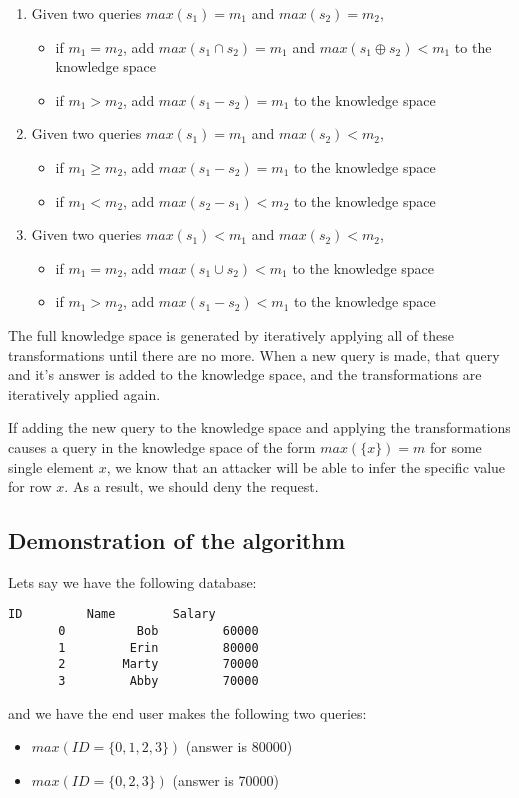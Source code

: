 \documentclass{article}
\begin{document}
\begin{enumerate}
    \item Given two queries $max(s_1) = m_1$ and $max(s_2) = m_2$,
    \begin{itemize}
        \item if $m_1 = m_2$, add $max(s_1 \cap s_2) = m_1$ and $max(s_1 \oplus s_2) < m_1$ to the knowledge space
        \item if $m_1 > m_2$, add $max(s_1 - s_2) = m_1$ to the knowledge space
    \end{itemize}
    \item Given two queries $max(s_1) = m_1$ and $max(s_2) < m_2$,
    \begin{itemize}
        \item if $m_1 \geq m_2$, add $max(s_1 - s_2) = m_1$ to the knowledge space
        \item if $m_1 < m_2$, add $max(s_2 - s_1) < m_2$ to the knowledge space
    \end{itemize}
    \item Given two queries $max(s_1) < m_1$ and $max(s_2) < m_2$,
    \begin{itemize}
        \item if $m_1 = m_2$, add $max(s_1 \cup s_2) < m_1$ to the knowledge space
        \item if $m_1 > m_2$, add $max(s_1 - s_2) < m_1$ to the knowledge space
    \end{itemize}
\end{enumerate}

The full knowledge space is generated by iteratively applying all of these transformations until there are no more.
When a new query is made, that query and it's answer is added to the knowledge space, and the transformations are iteratively applied again.

If adding the new query to the knowledge space and applying the transformations causes a query in the knowledge space of the form $max(\{x\}) = m$ for some single element $x$, we know that an attacker will be able to infer the specific value for row $x$.
As a result, we should deny the request.

\subsection{Demonstration of the algorithm}


\begin{minipage}{\textwidth}
Lets say we have the following database:
\begin{lstlisting}[frame=single]
      ID         Name        Salary
       0          Bob         60000
       1         Erin         80000
       2        Marty         70000
       3         Abby         70000
\end{lstlisting}

and we have the end user makes the following two queries:
\begin{itemize}
    \item $max(ID=\{0, 1, 2, 3\})$ (answer is 80000)
    \item $max(ID=\{0, 2, 3\})$ (answer is 70000)
\end{itemize}
\end{minipage}
\end{document}
